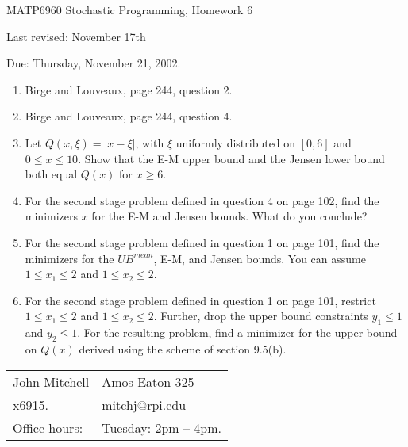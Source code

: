 \documentclass[12pt]{article}
\begin{document}
\begin{center}
  \begin{large}
     MATP6960 Stochastic Programming, Homework 6
  \end{large}
\end{center}

\begin{center}
Last revised: November 17th
\end{center}

\begin{flushright}
   Due:  Thursday, November 21, 2002.
\end{flushright}

\vspace{\baselineskip}


\begin{enumerate}
\item Birge and Louveaux, page 244, question 2.
\item Birge and Louveaux, page 244, question 4.
\item Let $Q(x,\xi)=|x-\xi|$, with $\xi$ uniformly distributed on $[0,6]$
and $0 \leq x \leq 10$.
Show that the E-M upper bound and the Jensen lower bound both
equal $Q(x)$ for $x \geq 6$.
\item
For the second stage problem defined in question 4 on page 102,
find the minimizers $x$ for the E-M and Jensen bounds.
What do you conclude?
\item
For the second stage problem defined in question 1 on page 101,
find the minimizers for the $UB^{mean}$, E-M, and Jensen bounds.
You can assume $1 \leq x_1 \leq 2$ and $1 \leq x_2 \leq 2$.
\item
For the second stage problem defined in question 1 on page 101,
restrict $1 \leq x_1 \leq 2$ and $1 \leq x_2 \leq 2$.
Further, drop the upper bound constraints $y_1 \leq 1$ and $y_2 \leq 1$.
For the resulting problem,
find a minimizer for the upper bound on $Q(x)$ derived using
the scheme of section 9.5(b).
\end{enumerate}

\vfill

\begin{tabular}{@{\hspace{.5in}}ll}
   John Mitchell  &
   Amos Eaton 325  \\
   x6915.  &
   mitchj@rpi.edu  \\
   Office hours:  &
   Tuesday: 2pm -- 4pm.
\end{tabular}
\end{document}
